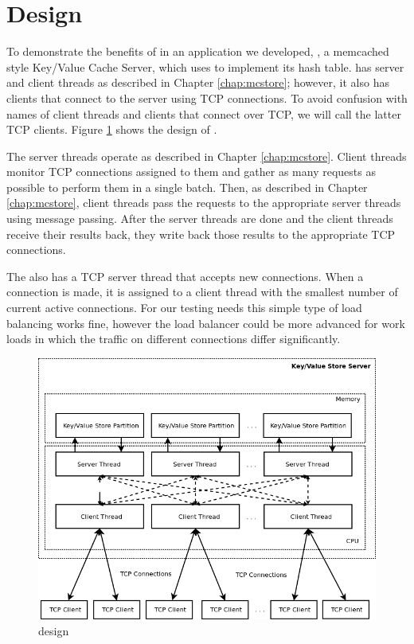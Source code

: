 \section{\cpserver{} Design}
\label{chap:cpserver}

To demonstrate the benefits of \cphash{} in an application we developed, \cpserver{}, a memcached style
Key/Value Cache Server, which uses \cphash{} to implement its hash table.
\cpserver{} has server and client threads as described in Chapter \ref{chap:mcstore}; however,
it also has clients that connect to the server using TCP connections. To avoid confusion with names of client threads and
clients that connect over TCP, we will call the latter TCP clients. Figure \ref{fig:mcserver} shows the design of \cpserver{}.

The server threads operate as described in Chapter \ref{chap:mcstore}. Client threads monitor TCP connections assigned to them 
and gather as many requests as possible to perform them in a single batch. Then, as described in Chapter \ref{chap:mcstore}, client threads pass the 
requests to the appropriate server threads using message passing. After the server threads are done and the client threads receive their results back, they write back 
those results to the appropriate TCP connections. 

The \cpserver{} also has a TCP server thread that accepts new connections. When a connection is made, 
it is assigned to a client thread with the smallest number of current active connections. For our testing needs this simple type of load balancing works fine, 
however the load balancer could be more advanced for work loads in which the traffic on different connections differ significantly.


\begin{figure}[!ht]
  \centering
  \includegraphics[width=1.0\linewidth]{figs/mcserver.png}
  \caption{\cpserver{} design}
  \label{fig:mcserver}
\end{figure}

